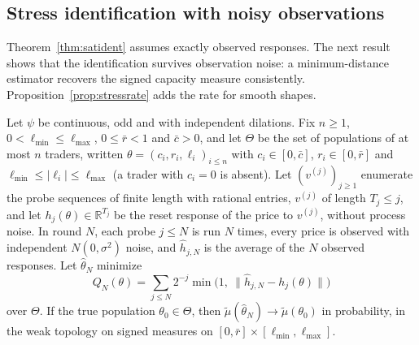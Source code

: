 \subsection{Stress identification with noisy observations}\label{app:noisystress}

Theorem~\ref{thm:satident} assumes exactly observed responses. The next result shows that the identification survives observation noise: a minimum-distance estimator recovers the signed capacity measure consistently. Proposition~\ref{prop:stressrate} adds the rate for smooth shapes.

\begin{proposition}\label{prop:noisystress}
Let $\psi$ be continuous, odd and with independent dilations. Fix $n\ge1$, $0<\ell_{\min}\le\ell_{\max}$, $0\le\bar r<1$ and $\bar c>0$, and let $\Theta$ be the set of populations of at most $n$ traders, written $\theta=(c_i,r_i,\ell_i)_{i\le n}$ with $c_i\in[0,\bar c]$, $r_i\in[0,\bar r]$ and $\ell_{\min}\le|\ell_i|\le\ell_{\max}$ (a trader with $c_i=0$ is absent). Let $(v^{(j)})_{j\ge1}$ enumerate the probe sequences of finite length with rational entries, $v^{(j)}$ of length $T_j\le j$, and let $h_j(\theta)\in\mathbb R^{T_j}$ be the reset response of the price to $v^{(j)}$, without process noise. In round $N$, each probe $j\le N$ is run $N$ times, every price is observed with independent $N(0,\sigma^2)$ noise, and $\hat h_{j,N}$ is the average of the $N$ observed responses. Let $\hat\theta_N$ minimize
\[
 Q_N(\theta)=\sum_{j\le N}2^{-j}\min\bigl(1,\ \|\hat h_{j,N}-h_j(\theta)\|\bigr)
\]
over $\Theta$. If the true population $\theta_0\in\Theta$, then $\tilde\mu(\hat\theta_N)\to\tilde\mu(\theta_0)$ in probability, in the weak topology on signed measures on $[0,\bar r]\times[\ell_{\min},\ell_{\max}]$.
\end{proposition}

